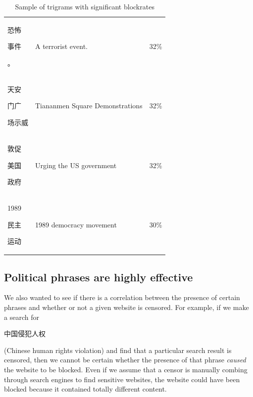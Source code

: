 \begin{table}[t]
\begin{center}
{\begin{tabular}{ l | l | c }
        \begin{CJK*}{UTF8}{gbsn}恐怖\end{CJK*} \begin{CJK*}{UTF8}{gbsn}事件\end{CJK*} \begin{CJK*}{UTF8}{gbsn}。\end{CJK*} & A terrorist event. & 32\% \\
        \begin{CJK*}{UTF8}{gbsn}天安\end{CJK*} \begin{CJK*}{UTF8}{gbsn}门广\end{CJK*} \begin{CJK*}{UTF8}{gbsn}场示威\end{CJK*} & Tiananmen Square Demonstrations & 32\% \\
        \begin{CJK*}{UTF8}{gbsn}敦促\end{CJK*} \begin{CJK*}{UTF8}{gbsn}美国\end{CJK*} \begin{CJK*}{UTF8}{gbsn}政府\end{CJK*} & Urging the US government & 32\% \\
        \begin{CJK*}{UTF8}{gbsn}1989\end{CJK*} \begin{CJK*}{UTF8}{gbsn}民主\end{CJK*} \begin{CJK*}{UTF8}{gbsn}运动\end{CJK*} & 1989 democracy movement & 30\% \\
      \end{tabular}}
  \end{center}
  \caption{\label{effective-trigrams}Sample of trigrams with
    significant blockrates}
\end{table}

\subsection{Political phrases are highly effective}
\label{phrases-eval}

We also wanted to see if there is a correlation between the
presence of certain phrases and whether or not a given website is
censored.  For example, if we make a search
for \begin{CJK*}{UTF8}{gbsn}中国侵犯人权\end{CJK*} (Chinese human
rights violation) and find that a particular search result is
censored, then we cannot be certain whether the presence of that phrase
\textit{caused} the website to be blocked. Even if we assume 
that a censor is manually combing through search engines to find
sensitive websites, the website could have been blocked because it
contained totally different content.

